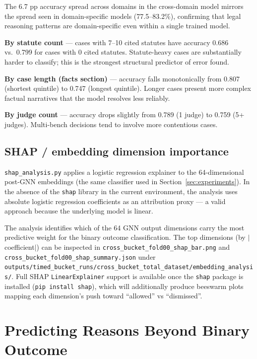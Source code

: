 \documentclass[12pt,a4paper]{article}
\begin{document}
The 6.7 pp accuracy spread across domains in the cross-domain model mirrors the spread seen in domain-specific models (77.5–83.2\%), confirming that legal reasoning patterns are domain-specific even within a single trained model.

\textbf{By statute count} — cases with 7–10 cited statutes have accuracy 0.686 vs.\ 0.799 for cases with 0 cited statutes. Statute-heavy cases are substantially harder to classify; this is the strongest structural predictor of error found.

\textbf{By case length (facts section)} — accuracy falls monotonically from 0.807 (shortest quintile) to 0.747 (longest quintile). Longer cases present more complex factual narratives that the model resolves less reliably.

\textbf{By judge count} — accuracy drops slightly from 0.789 (1 judge) to 0.759 (5+ judges). Multi-bench decisions tend to involve more contentious cases.

\subsection{SHAP / embedding dimension importance}

\texttt{shap\_analysis.py} applies a logistic regression explainer to the 64-dimensional post-GNN embeddings (the same classifier used in Section~\ref{sec:experiments}). In the absence of the \texttt{shap} library in the current environment, the analysis uses absolute logistic regression coefficients as an attribution proxy — a valid approach because the underlying model is linear.

The analysis identifies which of the 64 GNN output dimensions carry the most predictive weight for the binary outcome classification. The top dimensions (by $|$coefficient$|$) can be inspected in \texttt{cross\_bucket\_fold00\_shap\_bar.png} and \texttt{cross\_bucket\_fold00\_shap\_summary.json} under \texttt{outputs/\allowbreak timed\_bucket\_runs/\allowbreak cross\_bucket\_total\_dataset/\allowbreak embedding\_analysis/}. Full SHAP \texttt{LinearExplainer} support is available once the \texttt{shap} package is installed (\texttt{pip install shap}), which will additionally produce beeswarm plots mapping each dimension's push toward ``allowed'' vs ``dismissed''.

\section{Predicting Reasons Beyond Binary Outcome}
\end{document}

